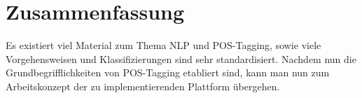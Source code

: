 \section{Zusammenfassung}
\label{sec:related:conclusion}

Es existiert viel Material zum Thema NLP und POS-Tagging, sowie viele Vorgehensweisen und Klassifizierungen sind sehr standardisiert. Nachdem nun die Grundbegrifflichkeiten von POS-Tagging etabliert sind, kann man nun zum Arbeitskonzept der zu implementierenden Plattform übergehen.

